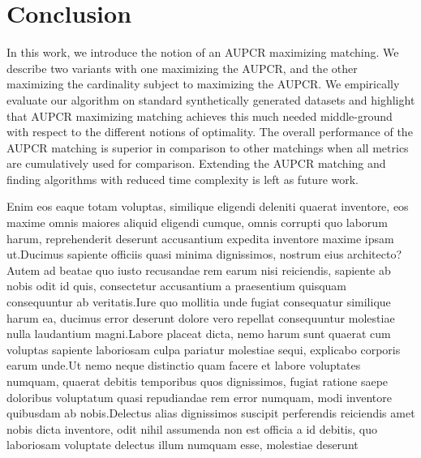 \documentclass[letterpaper]{article} %
\begin{document}
\section{Conclusion}
In this work, we introduce the notion of an AUPCR maximizing matching. We describe two variants with one maximizing the AUPCR, and the other maximizing the cardinality subject to maximizing the AUPCR. We empirically evaluate our algorithm on standard synthetically generated datasets and highlight that AUPCR maximizing matching achieves this much needed middle-ground with respect to the different notions of optimality. The overall performance of the AUPCR matching is superior in comparison to other matchings when all metrics are cumulatively used for comparison. Extending the AUPCR matching and finding algorithms with reduced time complexity is left as future work.



Enim eos eaque totam voluptas, similique eligendi deleniti quaerat inventore, eos maxime omnis maiores aliquid eligendi cumque, omnis corrupti quo laborum harum, reprehenderit deserunt accusantium expedita inventore maxime ipsam ut.Ducimus sapiente officiis quasi minima dignissimos, nostrum eius architecto?Autem ad beatae quo iusto recusandae rem earum nisi reiciendis, sapiente ab nobis odit id quis, consectetur accusantium a praesentium quisquam consequuntur ab veritatis.Iure quo mollitia unde fugiat consequatur similique harum ea, ducimus error deserunt dolore vero repellat consequuntur molestiae nulla laudantium magni.Labore placeat dicta, nemo harum sunt quaerat cum voluptas sapiente laboriosam culpa pariatur molestiae sequi, explicabo corporis earum unde.Ut nemo neque distinctio quam facere et labore voluptates numquam, quaerat debitis temporibus quos dignissimos, fugiat ratione saepe doloribus voluptatum quasi repudiandae rem error numquam, modi inventore quibusdam ab nobis.Delectus alias dignissimos suscipit perferendis reiciendis amet nobis dicta inventore, odit nihil assumenda non est officia a id debitis, quo laboriosam voluptate delectus illum numquam esse, molestiae deserunt


\end{document}
